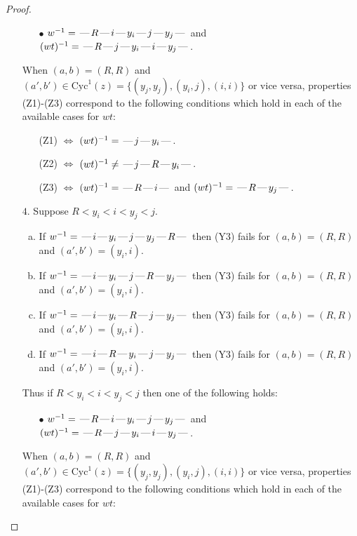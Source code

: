 \documentclass[10pt]{article}
\theoremstyle{definition}
\theoremstyle{definition}
\def\dash{\text{\hspace{0.5mm}---\hspace{0.5mm}}}
\def\Cyc{\mathrm{Cyc}}
\begin{document}
\begin{proof}
\begin{enumerate}
\begin{enumerate}
\item[$\bullet$] $w^{-1} = \dash R\dash i\dash y_i\dash j\dash y_j\dash $ and $(wt)^{-1} = \dash R\dash j\dash y_i\dash i\dash y_j\dash $.
\end{enumerate}
When $(a,b)= (R,R)$ and $(a',b')\in \Cyc^1(z)=\{(y_j,y_j),(y_i,j),(i,i)\}$ or vice versa,
properties (Z1)-(Z3) correspond to the following conditions which
hold in each of the available cases for $wt$:
\begin{enumerate}
\item[](Z1) $\Leftrightarrow$ $(wt)^{-1} = \dash j \dash y_i \dash$.
\item[](Z2) $\Leftrightarrow$ $(wt)^{-1} \neq \dash j \dash R \dash y_i \dash$.
\item[](Z3) $\Leftrightarrow$ $(wt)^{-1} = \dash R \dash i \dash$  and $(wt)^{-1} = \dash R \dash y_j \dash$.
\end{enumerate}
\item[$4$.] Suppose $R < y_i < i < y_j < j$.
\begin{enumerate}[(a)]
\item If $w^{-1} = \dash i\dash y_i\dash j\dash y_j\dash R\dash $ then (Y3) fails for $(a,b)=(R,R)$ and $(a',b')=(y_i,i)$.
\item If $w^{-1} = \dash i\dash y_i\dash j\dash R\dash y_j\dash $ then (Y3) fails for $(a,b)=(R,R)$ and $(a',b')=(y_i,i)$.
\item If $w^{-1} = \dash i\dash y_i\dash R\dash j\dash y_j\dash $ then (Y3) fails for $(a,b)=(R,R)$ and $(a',b')=(y_i,i)$.
\item If $w^{-1} = \dash i\dash R\dash y_i\dash j\dash y_j\dash $ then (Y3) fails for $(a,b)=(R,R)$ and $(a',b')=(y_i,i)$.
\end{enumerate}
Thus if $R < y_i < i < y_j < j$ then one of the following holds:
\begin{enumerate}
\item[$\bullet$] $w^{-1} = \dash R\dash i\dash y_i\dash j\dash y_j\dash $ and $(wt)^{-1} = \dash R\dash j\dash y_i\dash i\dash y_j\dash $.
\end{enumerate}
When $(a,b)= (R,R)$ and $(a',b')\in \Cyc^1(z)=\{(y_j,y_j),(y_i,j),(i,i)\}$ or vice versa,
properties (Z1)-(Z3) correspond to the following conditions which
hold in each of the available cases for $wt$:
\end{enumerate}
\end{proof}
\end{document}
